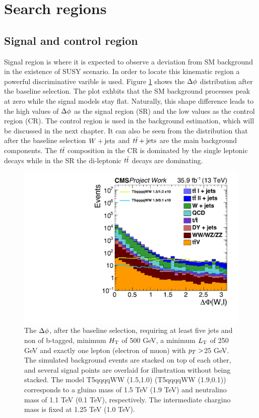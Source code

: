 \section{Search regions}
\subsection{Signal and control region}
Signal region is where it is expected to observe a deviation from SM background in the existence of SUSY scenario. In order to locate this kinematic region a powerful discriminative varible is used. Figure \ref{fig:DF} shows the $\Delta \phi$ distribution after the baseline selection. The plot exhbits that the SM background processes peak at zero while the signal models stay flat. Naturally, this shape difference leads to the high values of $\Delta \phi$ as the signal region (SR) and the low values as the control region (CR). The control region is used in the background estimation, which will be discussed in the next chapter. It can also be seen from the distribution that after the baseline selection $W+\textrm{jets}$ and $t\bar{t}+\textrm{jets}$ are the main background components. The $t\bar{t}$ composition in the CR is dominated by the single leptonic decays while in the SR the di-leptonic  $t\bar{t}$ decays are dominating. 
 \begin{figure}[!hbt]
    \begin{center}
 \includegraphics[width=0.5 \textwidth]{Plots/analysis/signalRegions/deltaPhi_Wl_narrownormal}
  \caption{ \label{fig:DF} The $\Delta \phi$, after the baseline selection, requiring at least five jets and non of b-tagged, minimum $H_{\rm T}$ of 500 GeV, a minimum $L_{\rm T}$ of 250 GeV and exactly one lepton (electron of muon) with $p_T >$25 GeV. The simulated background events are stacked on top of each other, and several signal points are overlaid for illustration without being stacked. The model T5qqqqWW (1.5,1.0) (T5qqqqWW (1.9,0.1)) corresponds to a gluino mass of 1.5 TeV (1.9 TeV) and neutralino mass of 1.1 TeV (0.1 TeV), respectively. The intermediate chargino mass is fixed at 1.25 TeV (1.0 TeV).
  }
   \end{center}
\end{figure}
